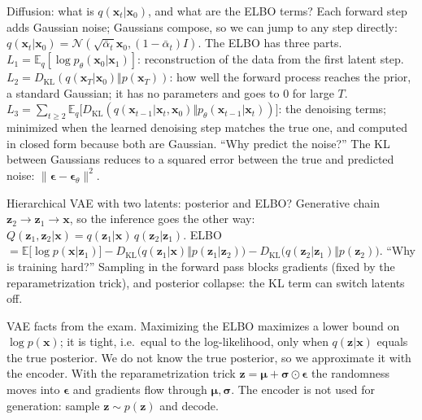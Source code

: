 \begin{qabox}[Brandstetter]{\cexam Diffusion: what is $q(\mathbf{x}_t|\mathbf{x}_0)$, and what are the ELBO terms?}
\ans Each forward step adds Gaussian noise; Gaussians compose, so we can jump to any step directly:
$q(\mathbf{x}_t|\mathbf{x}_0)=\mathcal{N}(\sqrt{\bar\alpha_t}\mathbf{x}_0,(1-\bar\alpha_t)I)$. The ELBO has
three parts. $L_1=\mathbb{E}_q[\log p_\theta(\mathbf{x}_0|\mathbf{x}_1)]$: reconstruction of the data
from the first latent step. $L_2=D_{\mathrm{KL}}(q(\mathbf{x}_T|\mathbf{x}_0)\Vert p(\mathbf{x}_T))$:
how well the forward process reaches the prior, a standard Gaussian; it has no parameters and goes
to 0 for large $T$. $L_3=\sum_{t\ge2}\mathbb{E}_q\bigl[D_{\mathrm{KL}}(q(\mathbf{x}_{t-1}|\mathbf{x}_t,\mathbf{x}_0)\Vert p_\theta(\mathbf{x}_{t-1}|\mathbf{x}_t))\bigr]$:
the denoising terms; minimized when the learned denoising step matches the true one, and computed in
closed form because both are Gaussian.
\follow ``Why predict the noise?'' The KL between Gaussians reduces to a squared error between the
true and predicted noise: $\lVert\bm\epsilon-\bm\epsilon_\theta\rVert^2$.
\end{qabox}

\begin{qabox}[Brandstetter]{\cexam Hierarchical VAE with two latents: posterior and ELBO?}
\ans Generative chain $\mathbf{z}_2\to\mathbf{z}_1\to\mathbf{x}$, so the inference goes the other
way: $Q(\mathbf{z}_1,\mathbf{z}_2|\mathbf{x})=q(\mathbf{z}_1|\mathbf{x})\,q(\mathbf{z}_2|\mathbf{z}_1)$.
\formula
ELBO $=\mathbb{E}\bigl[\log p(\mathbf{x}|\mathbf{z}_1)\bigr]-D_{\mathrm{KL}}\bigl(q(\mathbf{z}_1|\mathbf{x})\Vert p(\mathbf{z}_1|\mathbf{z}_2)\bigr)-D_{\mathrm{KL}}\bigl(q(\mathbf{z}_2|\mathbf{z}_1)\Vert p(\mathbf{z}_2)\bigr)$.
\follow ``Why is training hard?'' Sampling in the forward pass blocks gradients (fixed by the
reparametrization trick), and posterior collapse: the KL term can switch latents off.
\end{qabox}

\begin{qabox}[Brandstetter]{\cexam VAE facts from the exam.}
\ans Maximizing the ELBO maximizes a lower bound on $\log p(\mathbf{x})$; it is tight, i.e.\ equal
to the log-likelihood, only when $q(\mathbf{z}|\mathbf{x})$ equals the true posterior. We do not know
the true posterior, so we approximate it with the encoder. With the reparametrization trick
$\mathbf{z}=\bm\mu+\bm\sigma\odot\bm\epsilon$ the randomness moves into $\bm\epsilon$ and gradients
flow through $\bm\mu,\bm\sigma$. The encoder is not used for generation: sample $\mathbf{z}\sim p(\mathbf{z})$
and decode.
\end{qabox}

